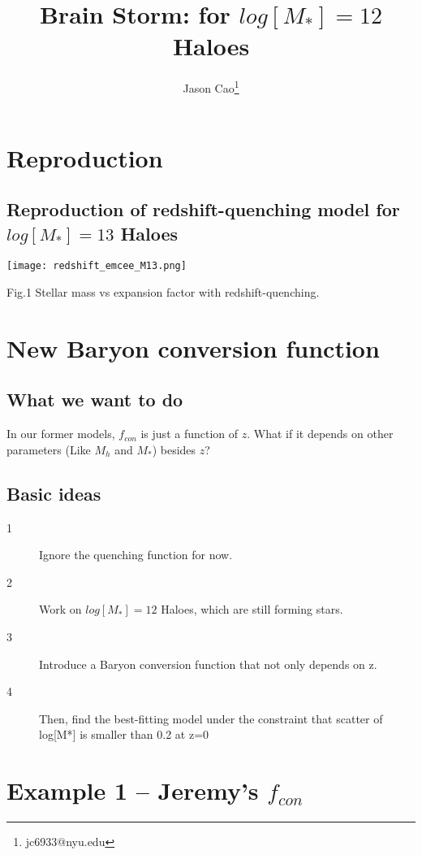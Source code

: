 \documentclass[ajp]{article}   	%
\title{Brain Storm: for $log[M_*] =12 $ Haloes}
\author[1]{Jason Cao\thanks{jc6933@nyu.edu}}
\date{}							%
\begin{document}
\maketitle
\section{Reproduction}

\subsection{Reproduction of redshift-quenching model for $log[M_*] =13 $ Haloes}

\begin{center}
\texttt{[image: redshift\_emcee\_M13.png]}

\centerline{Fig.1 Stellar mass vs expansion factor with redshift-quenching.}

\end{center}

\section{New Baryon conversion function}

\subsection{What we want to do}

In our former models, $f_{con}$ is just a function of $z$. What if it depends on other parameters (Like $M_h$ and $M_*$) besides $z$?

\subsection{Basic ideas}

\begin{description}
 \item[1] Ignore the quenching function for now.
 \item[2] Work on $log[M_*] =12 $ Haloes, which are still forming stars.
  \item[3] Introduce a Baryon conversion function that not only depends on z.
 \item[4] Then, find the best-fitting model under the constraint that scatter of log[M*] is smaller than 0.2 at z=0

\end{description}


\section{Example 1 -- Jeremy's $f_{con}$}
\end{document}
